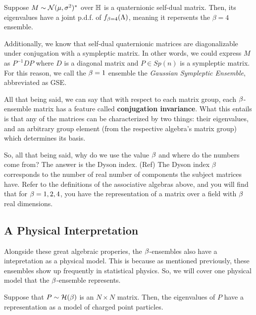 \bigskip

 Suppose $M \sim \mathcal{N}(\mu,\sigma^2)^*$ over $\mathbb{H}$ is a quaternionic self-dual matrix.
Then, its eigenvalues have a joint p.d.f. of $f_{\beta = 4}(\Lambda)$, meaning it repersents the $\beta = 4$ ensemble.

Additionally, we know that self-dual quaternionic matrices are diagonalizable under conjugation with a sympleptic matrix.
In other words, we could express $M$ as $P^{-1} D P$ where $D$ is a diagonal matrix and $P \in Sp(n)$ is a sympleptic matrix.
For this reason, we call the $\beta = 1$ ensemble the \textit{Gaussian Sympleptic Ensemble}, abbreviated as GSE.

\bigskip

All that being said, we can say that with respect to each matrix group, each $\beta$-ensemble matrix has a feature called
\textbf{conjugation invariance}. What this entails is that any of the matrices can be characterized by two things: their eigenvalues, and an arbitrary group element (from the respective algebra's matrix group) which determines its basis.

\newpage

So, all that being said, why do we use the value $\beta$ and where do the numbers come from? The answer is the Dyson index. (Ref)
The Dyson index $\beta$ corresponds to the number of real number of components the subject matrices have. Refer to the definitions
of the associative algebras above, and you will find that for $\beta = 1,2,4$, you have the representation of a matrix over a field with $\beta$ real dimensions.


\newpage
\subsection{A Physical Interpretation}

Alongside these great algebraic properies, the $\beta$-ensembles also have a intepretation as a physical model.
This is because as mentioned previously, these ensembles show up frequently in statistical physics.
So, we will cover one physical model that the $\beta$-ensemble represents.

Suppose that $P \sim \mathcal{H}(\beta)$ is an $N \times N$ matrix. Then, the eigenvalues of $P$ have a representation as a model of charged point particles.

